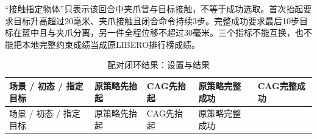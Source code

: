 
``接触指定物体''只表示该回合中夹爪曾与目标接触，不等于成功选取。首次抬起要求目标升高超过20毫米、夹爪接触且闭合命令持续3步。完整成功要求最后10步目标在篮中且与夹爪分离，另一件全程位移不超过30毫米。三个指标不能互换，也不能把本地完整约束成绩当成原LIBERO排行榜成绩。

\FloatBarrier\begingroup\small\setlength{\tabcolsep}{2.5pt}
\begin{longtable}[]{@{}
  >{\raggedright\arraybackslash}p{}
  >{\raggedright\arraybackslash}p{}
  >{\raggedright\arraybackslash}p{}
  >{\raggedright\arraybackslash}p{}
  >{\raggedright\arraybackslash}p{}@{}}
\caption{配对闭环结果：设置与结果}\label{tab:s14-5}\tabularnewline
\toprule\noalign{}
\begin{minipage}[b]{\linewidth}\raggedright
场景 / 初态 / 指定目标
\end{minipage} & \begin{minipage}[b]{\linewidth}\raggedright
原策略先抬起
\end{minipage} & \begin{minipage}[b]{\linewidth}\raggedright
CAG先抬起
\end{minipage} & \begin{minipage}[b]{\linewidth}\raggedright
原策略完整成功
\end{minipage} & \begin{minipage}[b]{\linewidth}\raggedright
CAG完整成功
\end{minipage} \\
\midrule\noalign{}
\endfirsthead
\toprule\noalign{}
\begin{minipage}[b]{\linewidth}\raggedright
场景 / 初态 / 指定目标
\end{minipage} & \begin{minipage}[b]{\linewidth}\raggedright
原策略先抬起
\end{minipage} & \begin{minipage}[b]{\linewidth}\raggedright
CAG先抬起
\end{minipage} & \begin{minipage}[b]{\linewidth}\raggedright
原策略完整成功
\end{minipage} & \begin{minipage}[b]{\linewidth}\raggedright

\end{minipage}
\end{longtable}
